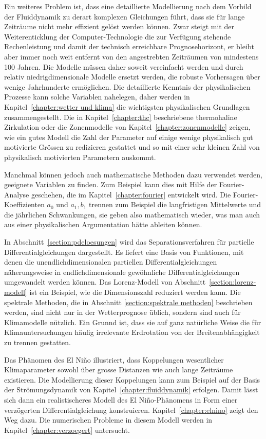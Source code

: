Ein weiteres Problem ist, dass eine detaillierte Modellierung nach dem
Vorbild der Fluiddynamik zu derart komplexen Gleichungen führt, dass 
sie für lange Zeiträume nicht mehr effizient gelöst werden können.
Zwar steigt mit der Weiterenticklung der Computer-Technologie die 
zur Verfügung stehende Rechenleistung und damit der technisch erreichbare
Prognosehorizont, er bleibt aber immer noch weit entfernt von den
angestrebten Zeiträumen von mindestens 100 Jahren.
Die Modelle müssen daher soweit vereinfacht werden und durch relativ
niedrigdimensionale Modelle ersetzt werden, die robuste Vorhersagen
über wenige Jahrhunderte ermöglichen.
Die detaillierte Kenntnis der physikalischen Prozesse kann solche 
Variablen nahelegen, daher werden in Kapitel~\ref{chapter:wetter und klima}
die wichtigsten physikalischen Grundlagen zusammengestellt.
Die in Kapitel~\ref{chapter:thc} beschriebene thermohaline Zirkulation
oder die Zonenmodelle von Kapitel~\ref{chapter:zonenmodelle}
zeigen, wie ein gutes Modell die Zahl der Parameter auf einige wenige
physikalisch gut motivierte Grössen zu redizieren gestattet und 
so mit einer sehr kleinen Zahl von physikalisch motivierten
Parametern auskommt.

Manchmal können jedoch auch mathematische Methoden dazu verwendet werden,
geeignete Variablen zu finden.
Zum Beispiel kann dies mit Hilfe der Fourier-Analyse geschehen, die
im Kapitel~\ref{chapter:fourier} entwickelt wird.
Die Fourier-Koeffizienten $a_0$ und $a_1,b_1$ trennen zum Beispiel die
langfristigen Mittelwerte und die jährlichen Schwankungen, sie geben
also mathematisch wieder, was man auch aus einer physikalischen
Argumentation hätte ableiten können.

In Abschnitt~\ref{section:pdeloesungen} wird das Separationsverfahren 
für partielle Differentialgleichungen dargestellt.
Es liefert eine Basis von Funktionen, mit denen die unendlichdimensionalen
partiellen Differentialgleichungen näherungsweise in endlichdimensionale
gewöhnliche Differentialgleichungen umgewandelt werden können.
Das Lorenz-Modell von Abschnitt~\ref{section:lorenz-modell} ist ein
Beispiel, wie die Dimensionszahl reduziert werden kann.
Die spektrale Methoden, die in Abschnitt \ref{section:spektrale methoden}
beschrieben werden, sind nicht nur in der Wetterprognose üblich, sondern
sind auch für Klimamodelle nützlich.
Ein Grunnd ist, dass sie auf ganz natürliche Weise die für
Klimauntersuchungen häufig irrelevante Erdrotation von der
Breitenabhängigkeit zu trennen gestatten.

Das Phänomen des El Niño illustriert, dass Koppelungen wesentlicher
Klimaparameter sowohl über grosse Distanzen wie auch lange Zeiträume
existieren.
Die Modellierung dieser Koppelungen kann zum Beispiel auf der Basis
der Strömungsdynamik von Kapitel~\ref{chapter:fluiddynamik} erfolgen.
Damit lässt sich dann ein realistischeres Modell des El Niño-Phänomens
in Form einer verzögerten Differentialgleichung konstruieren.
Kapitel~\ref{chapter:elnino} zeigt den Weg dazu.
Die numerischen Probleme in diesem Modell werden in
Kapitel~\ref{chapter:verzoegert} untersucht.

